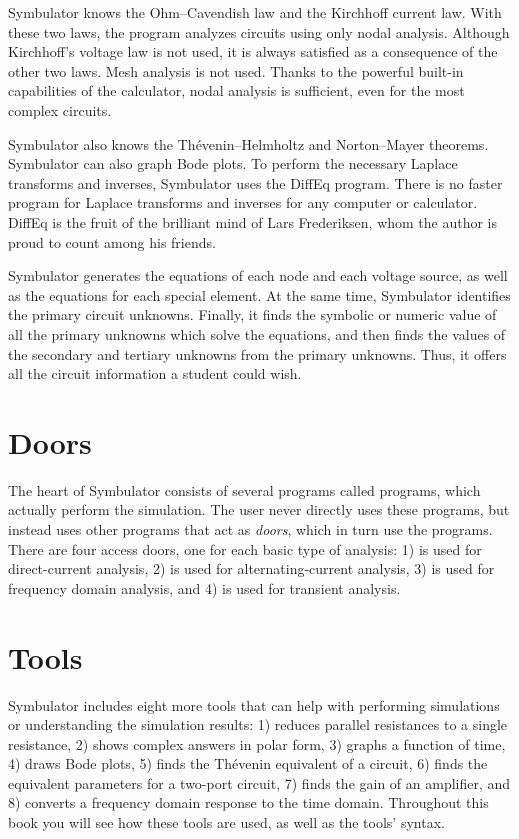 Symbulator knows the Ohm--Cavendish law and the Kirchhoff current
law. With these two laws, the program analyzes circuits using only
nodal analysis. Although Kirchhoff's voltage law is not used, it is
always satisfied as a consequence of the other two laws. Mesh
analysis is not used. Thanks to the powerful built-in capabilities
of the calculator, nodal analysis is sufficient, even for the most
complex circuits.

Symbulator also knows the Th\'evenin--Helmholtz and Norton--Mayer
theorems. Symbulator can also graph Bode plots. To perform the
necessary Laplace transforms and inverses, Symbulator uses the
DiffEq program. There is no faster program for Laplace transforms
and inverses for any computer or calculator. DiffEq is the fruit of
the brilliant mind of Lars Frederiksen, whom the author is proud to
count among his friends.

Symbulator generates the equations of each node and each voltage
source, as well as the equations for each special element. At the
same time, Symbulator identifies the primary circuit unknowns.
Finally, it finds the symbolic or numeric value of all the primary
unknowns which solve the equations, and then finds the values of the
secondary and tertiary unknowns from the primary unknowns. Thus, it
offers all the circuit information a student could wish.

\section{Doors}

The heart of Symbulator consists of several programs called
 programs, which actually perform the simulation. The
user never directly uses these  programs, but instead
uses other programs that act as \emph{doors}, which in turn use the
 programs. There are four access doors, one for each
basic type of analysis: 1)  is used for direct-current
analysis, 2)  is used for alternating-current analysis, 3)
 is used for frequency domain analysis, and 4)  is
used for transient analysis.

\section{Tools}

Symbulator includes eight more tools that can help with performing
simulations or understanding the simulation results: 1) 
reduces parallel resistances to a single resistance, 2)
 shows complex answers in polar form, 3) 
graphs a function of time, 4)  draws Bode plots, 5)
 finds the Th\'evenin equivalent of a circuit, 6)
 finds the equivalent parameters for a two-port circuit,
7)  finds the gain of an amplifier, and 8)
 converts a frequency domain response to the time
domain. Throughout this book you will see how these tools are used,
as well as the tools' syntax.

